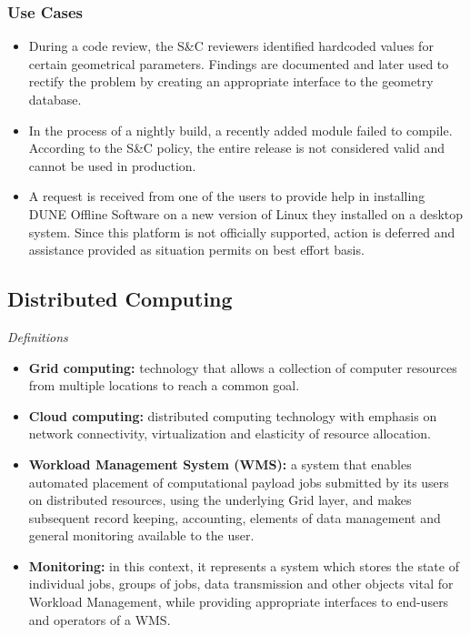 \subsubsection{Use Cases}
\begin{itemize}
\item During a code review, the S\&C reviewers identified hardcoded values for certain geometrical parameters. Findings are documented and later used to rectify the problem by creating an appropriate interface to the geometry database.

\item In the process of a nightly build, a recently added module failed to compile. According to the S\&C policy, the entire release is not considered valid and cannot be used in production.

\item A request is received from one of the users to provide help in installing DUNE Offline Software on a new version of Linux they installed on a desktop system. Since this platform is not officially supported, action is deferred and assistance provided as situation permits on best effort basis.

\end{itemize}

\newpage
\subsection{Distributed Computing}
\label{sec:dunedc}
\textit{Definitions}
\begin{itemize}
	\item \textbf{Grid computing:}  technology that allows a collection of computer resources from multiple locations to reach a common goal.
	
	\item \textbf{Cloud computing:} distributed computing technology with emphasis on network connectivity, virtualization and elasticity of resource allocation.
	
	\item \textbf{Workload Management System (WMS):} a system that enables automated placement of computational payload jobs submitted by its users on distributed resources, using the underlying Grid layer, and makes subsequent record keeping, accounting, elements of data management and general monitoring available to the user.
	
	\item \textbf{Monitoring:} in this context, it represents a system which stores the state of individual jobs, groups of jobs, data transmission and other objects vital for Workload Management, while providing appropriate interfaces to end-users and operators of a WMS.
\end{itemize}

